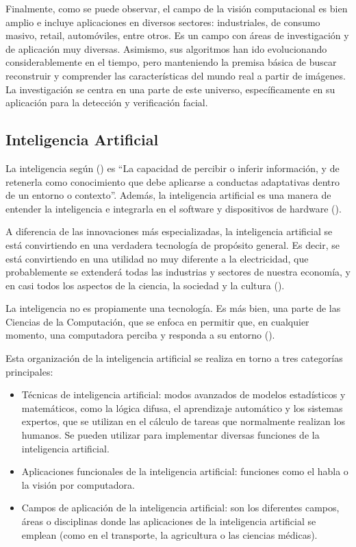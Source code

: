 Finalmente, como se puede observar, el campo de la visión computacional es bien amplio 
e incluye aplicaciones en diversos sectores: industriales, de consumo masivo, retail, 
automóviles, entre otros. Es un campo con áreas de investigación y de aplicación muy diversas. Asimismo, sus algoritmos han ido evolucionando considerablemente en el tiempo, pero manteniendo la premisa básica de buscar reconstruir y comprender las características del mundo real a partir de imágenes. La investigación se centra en una parte de este universo, específicamente en su aplicación para la detección y verificación facial. 


\subsection{Inteligencia Artificial}
La inteligencia según (\cite{dezhic2018intelligence}) es “La capacidad de percibir o inferir información, y de retenerla como conocimiento que debe aplicarse a conductas adaptativas dentro de un entorno o contexto”. Además, la inteligencia artificial es una manera de entender la inteligencia e integrarla en el software y dispositivos de hardware (\cite{maheshwari2018ai}). 

A diferencia de las innovaciones más especializadas, la inteligencia artificial se está convirtiendo en una verdadera tecnología de propósito general. Es decir, se está convirtiendo en una utilidad no muy diferente a la electricidad, que probablemente se extenderá todas las industrias y sectores de nuestra economía, y en casi todos los aspectos de la ciencia, la sociedad y la cultura (\cite{ford2018ai}).

La inteligencia no es propiamente una tecnología. Es más bien, una parte de las Ciencias de la Computación, que se enfoca en permitir que, en cualquier momento, una computadora perciba y responda a su entorno (\cite{norman2018computing}). 

Esta organización de la inteligencia artificial se realiza en torno a tres categorías 
principales: 

\begin{itemize}
    \item Técnicas de inteligencia artificial: modos avanzados de modelos estadísticos y matemáticos, como la lógica difusa, el aprendizaje automático y los sistemas expertos, que se utilizan en el cálculo de tareas que normalmente realizan los humanos. Se pueden utilizar para implementar diversas funciones de la inteligencia artificial.
    \item Aplicaciones funcionales de la inteligencia artificial: funciones como el habla o la visión por computadora.
    \item Campos de aplicación de la inteligencia artificial: son los diferentes campos, áreas o disciplinas donde las aplicaciones de la inteligencia artificial se emplean (como en el transporte, la agricultura o las ciencias médicas).
\end{itemize}


